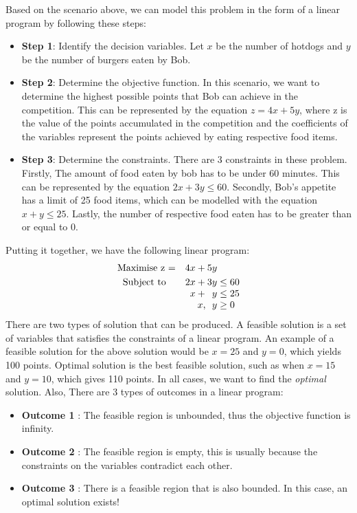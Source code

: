 \documentclass[a4paper, 12pt]{report}
\begin{document}
Based on the scenario above, we can model this problem in the form of a linear program by following these steps:
\begin{itemize}
\item \textbf{Step 1}: Identify the decision variables. Let \(x\) be the number of hotdogs and \(y\) be the number
of burgers eaten by Bob.
\item \textbf{Step 2}: Determine the objective function. In this scenario, we want to determine the highest possible
points that Bob can achieve in the competition. This can be represented by the equation \(z = 4x + 5y\), where
z is the value of the points accumulated in the competition and the coefficients of the variables represent the points achieved by eating respective
food items.
\item \textbf{Step 3}: Determine the constraints. There are 3 constraints in these problem. Firstly, The amount of
food eaten by bob has to be under 60 minutes. This can be represented by the equation \(2x + 3y \leq 60\). Secondly,
Bob's appetite has a limit of 25 food items, which can be modelled with the equation \(x + y \leq 25\). Lastly,
the number of respective food eaten has to be greater than or equal to 0.
\end{itemize}
Putting it together, we have the following linear program:
\[
  \begin{array}{r@{}r@{}l}
    \text{Maximise z =} \quad &{}4x + 5y \\[\jot]
    \text{Subject to}\qquad &{} 2x +   3y &{} \leq 60 \\
    \qquad &{} x +   \phantom{2}y &{} \leq 25 \\
    \qquad &{} x ,   \phantom{2}y &{} \geq 0 \\
  \end{array}
\]
There are two types of solution that can be produced. A feasible solution is a set of variables that satisfies the constraints
of a linear program. An example of a feasible solution for the above solution would be \(x = 25\) and \(y=0\), which yields 100 points.
Optimal solution is the best feasible solution, such as when \(x = 15\) and \(y = 10\), which gives 110 points. In all cases, we want to
find the \textit{optimal} solution. Also, There are 3 types of outcomes in a linear program:

\begin{itemize}
\item \textbf{Outcome 1} : The feasible region is unbounded, thus the objective function is infinity.
\item \textbf{Outcome 2} : The feasible region is empty, this is usually because the constraints on the variables contradict each other.
\item \textbf{Outcome 3} : There is a feasible region that is also bounded. In this case, an optimal solution exists!
\end{itemize}
\end{document}
